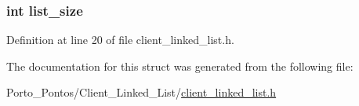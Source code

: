 \subsubsection[{list\+\_\+size}]{\setlength{\rightskip}{0pt plus 5cm}int list\+\_\+size}\label{structclient__linked__list_a51695a823cbcb573d6cf50043a5adb1a}


Definition at line 20 of file client\+\_\+linked\+\_\+list.\+h.



The documentation for this struct was generated from the following file\+:\begin{DoxyCompactItemize}
\item 
Porto\+\_\+\+Pontos/\+Client\+\_\+\+Linked\+\_\+\+List/\hyperlink{client__linked__list_8h}{client\+\_\+linked\+\_\+list.\+h}\end{DoxyCompactItemize}

